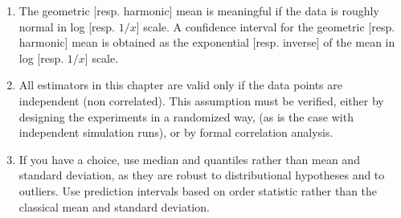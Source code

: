 \begin{enumerate}
\item The geometric [resp. harmonic] mean is meaningful if
    the data is roughly normal in log [resp. $1/x$] scale.
    A confidence interval for the geometric [resp.
    harmonic] mean is obtained as the exponential [resp.
    inverse] of the mean in log [resp. $1/x$] scale.

\item All estimators in this chapter are valid only if the
    data points are independent (non correlated). This
    assumption must be verified, either by designing the
    experiments in a randomized way, (as is the case with
    independent simulation runs), or by formal correlation
    analysis.
\item If you have a choice, use median and
quantiles rather than mean and standard
deviation, as they are robust to distributional
hypotheses and to outliers. Use prediction
intervals based on order statistic rather than
the classical mean and standard deviation.
\end{enumerate}
%
%
%
